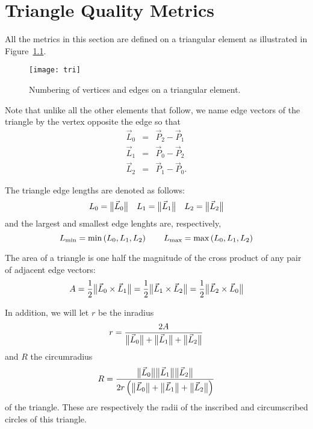 \chapter{Triangle Quality Metrics}

All the metrics in this section are defined on a triangular element
as illustrated in Figure~\ref{f:tri}.

\begin{figure}[bhp]
  \centering
  \texttt{[image: tri]}
  \caption{Numbering of vertices and edges on a triangular element.%
                                                                  \label{f:tri}}
\end{figure}

Note that unlike all the other elements that follow,
we name edge vectors of the triangle by the vertex opposite the edge so that
\begin{equation*}
\begin{array}{lcl}
  \vec L_0 &=& \vec P_2 - \vec P_1\\
  \vec L_1 &=& \vec P_0 - \vec P_2\\
  \vec L_2 &=& \vec P_1 - \vec P_0.
\end{array}
\end{equation*}

The triangle edge lengths are denoted as follows:
\[
L_0 = \big\lVert{\vec L_0}\big\rVert\quad
L_1 = \big\lVert{\vec L_1}\big\rVert\quad
L_2 = \big\lVert{\vec L_2}\big\rVert
\]
and the largest and smallest edge lenghts are, respectively,
\[
L_{\min} = \min\left(L_0, L_1, L_2\right)
  \rule{2em}{0pt}
L_{\max} = \max\left(L_0, L_1, L_2\right)
\]

The area of a triangle is one half the magnitude of the cross product of any pair of adjacent edge vectors:
\begin{equation*}
  A
    = \frac{1}{2}\big\lVert{\vec L_0\times\vec L_1}\big\rVert
    = \frac{1}{2}\big\lVert{\vec L_1\times\vec L_2}\big\rVert
    = \frac{1}{2}\big\lVert{\vec L_2\times\vec L_0}\big\rVert
\end{equation*}

In addition, we will let $r$ be the inradius
\begin{equation*}
\label{eq:Arp}
  r = \frac{2A}{\big\lVert{\vec L_0}\big\rVert + \big\lVert{\vec L_1}\big\rVert + \big\lVert{\vec L_2}\big\rVert}
\end{equation*}
and $R$ the circumradius
\[
  R = \frac{\normvec{L_0} \normvec{L_1} \normvec{L_2}}%
           {2 r \left(\normvec{L_0} + \normvec{L_1} + \normvec{L_2}\right)}
\]
of the triangle.
These are respectively the radii of the inscribed and circumscribed circles of this triangle.

